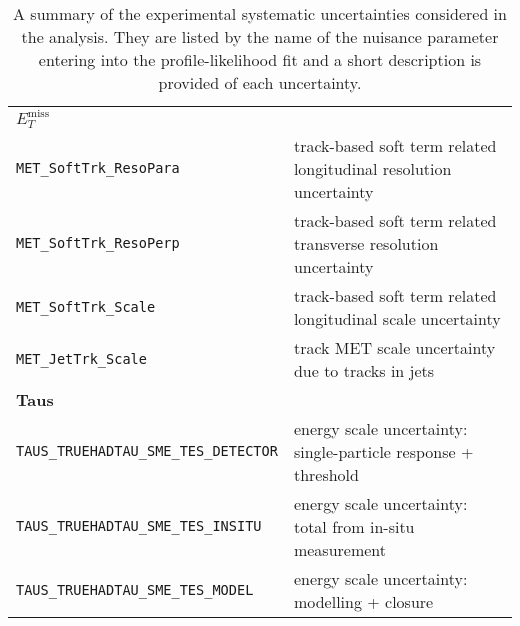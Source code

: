 \begin{table}
{\begin{tabular}{ll}
      {\bfseries $E_T^{\text{miss}}$}&\\
      \texttt{MET\_SoftTrk\_ResoPara} & track-based soft term related longitudinal resolution uncertainty \\
      \texttt{MET\_SoftTrk\_ResoPerp} &  track-based soft term related transverse resolution uncertainty \\
      \texttt{MET\_SoftTrk\_Scale} & track-based soft term related longitudinal scale uncertainty \\
      \texttt{MET\_JetTrk\_Scale} & track MET scale uncertainty due to tracks in jets \\
      {\bfseries Taus}&\\
      \texttt{TAUS\_TRUEHADTAU\_SME\_TES\_DETECTOR} & energy scale uncertainty: single-particle response + threshold \\
      \texttt{TAUS\_TRUEHADTAU\_SME\_TES\_INSITU} & energy scale uncertainty: total from in-situ measurement \\
      \texttt{TAUS\_TRUEHADTAU\_SME\_TES\_MODEL} & energy scale uncertainty: modelling + closure \\
      \bottomrule
    \end{tabular}
  }
  \caption{A summary of the experimental systematic uncertainties considered in
    the analysis. They are listed by the name of the nuisance parameter entering
    into the profile-likelihood fit and a short description is provided of each
    uncertainty.}
  \label{tab:expSyst}
\end{table}
